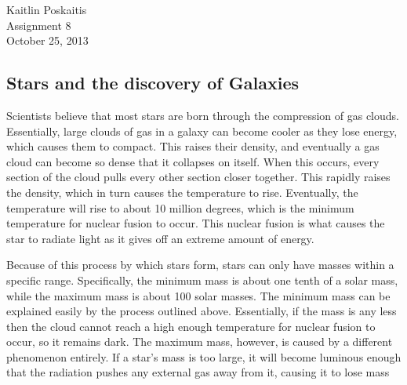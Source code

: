 \documentclass[12pt]{article}
\begin{document}
\noindent Kaitlin Poskaitis\\
Assignment 8\\
October 25, 2013
\begin{center}
    \section*{\bf Stars and the discovery of Galaxies}
\end{center}


Scientists believe that most stars are born through the compression of gas
clouds.  Essentially, large clouds of gas in a galaxy can become cooler as they
lose energy, which causes them to compact.  This raises their density, and
eventually a gas cloud can become so dense that it collapses on itself.  When
this occurs, every section of the cloud pulls every other section closer
together.  This rapidly raises the density, which in turn causes the temperature
to rise.  Eventually, the temperature will rise to about 10 million degrees,
which is the minimum temperature for nuclear fusion to occur.  This nuclear
fusion is what causes the star to radiate light as it gives off an extreme
amount of energy.

Because of this process by which stars form, stars can only have masses within a
specific range.  Specifically, the minimum mass is about one tenth of a solar
mass, while the maximum mass is about 100 solar masses.  The minimum mass can be
explained easily by the process outlined above.  Essentially, if the mass is any
less then the cloud cannot reach a high enough temperature for nuclear fusion to
occur, so it remains dark.  The maximum mass, however, is caused by a different
phenomenon entirely.  If a star's mass is too large, it will become luminous
enough that the radiation pushes any external gas away from it, causing it to
lose mass
\end{document}
